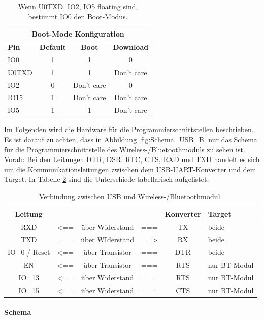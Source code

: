 \begin{table}[H]
\center
\begin{tabular}{|l|c|c|c|}
\hline
\multicolumn{4}{|c|}{\textbf{Boot-Mode Konfiguration}}\\
\hline
\textbf{Pin} & \textbf{Default} & \textbf{Boot} & \textbf{Download} \\
\hline
IO0 & 1 & 1 & 0 \\
\hline
U0TXD & 1 & 1 & Don't care \\
\hline
IO2 & 0 & Don't care & 0 \\
\hline
IO15 & 1 & Don't care & Don't care \\
\hline
IO5 & 1 & 1 & Don't care \\
\hline
\end{tabular}
\caption{Wenn U0TXD, IO2, IO5 floating sind, bestimmt IO0 den Boot-Modus.}
\label{tab:Einfluss_Pins_auf_Boot_Modus}
\end{table}

Im Folgenden wird die Hardware für die Programmierschnittstellen beschrieben. Es ist darauf zu achten, dass in Abbildung \ref{fig:Schema_USB_B} nur das Schema für die Programmierschnittstelle des Wireless-/Bluetoothmoduls zu sehen ist. Vorab: Bei den Leitungen DTR, DSR, RTC, CTS, RXD und TXD handelt es sich um die Kommunikationsleitungen zwischen dem USB-UART-Konverter und dem Target. In Tabelle \ref{tab:USB_ESP} sind die Unterschiede tabellarisch aufgelistet.

\begin{table}[H]
\center
\begin{tabular}{|c|lcl|c||l|}
\hline
\textbf{Leitung} & & & & \textbf{Konverter} & \textbf{Target} \\ \hline
RXD & <== & über Widerstand & === & TX & beide \\
TXD & === & über WIderstand & ==> & RX & beide\\
IO\_0 / Reset & <== & über Transistor & === & DTR & beide\\
EN & <== & über Transistor & === & RTS & nur BT-Modul\\
IO\_13 & <== & über Widerstand & === & RTS & nur BT-Modul\\
IO\_15 & <== & über Widerstand & === & CTS & nur BT-Modul\\
\hline
\end{tabular}
\caption{Verbindung zwischen USB und Wireless-/Bluetoothmodul.}
\label{tab:USB_ESP}
\end{table}

\paragraph{Schema}\mbox{}

